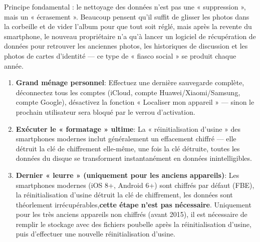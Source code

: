 


Principe fondamental : le nettoyage des données n'est pas une « suppression », mais un « écrasement ». Beaucoup pensent qu'il suffit de glisser les photos dans la corbeille et de vider l'album pour que tout soit réglé, mais après la revente du smartphone, le nouveau propriétaire n'a qu'à lancer un logiciel de récupération de données pour retrouver les anciennes photos, les historiques de discussion et les photos de cartes d'identité — ce type de « fiasco social » se produit chaque année.

\begin{enumerate}
  \item \textbf{Grand ménage personnel}: Effectuez une dernière sauvegarde complète, déconnectez tous les comptes (iCloud, compte Huawei/Xiaomi/Samsung, compte Google), désactivez la fonction « Localiser mon appareil » — sinon le prochain utilisateur sera bloqué par le verrou d'activation.
  \item \textbf{Exécuter le « formatage » ultime}: La « réinitialisation d'usine » des smartphones modernes inclut généralement un effacement chiffré — elle détruit la clé de chiffrement elle-même, une fois la clé détruite, toutes les données du disque se transforment instantanément en données inintelligibles.
  \item \textbf{Dernier « leurre » (uniquement pour les anciens appareils)}: Les smartphones modernes (iOS 8+, Android 6+) sont chiffrés par défaut (FBE), la réinitialisation d'usine détruit la clé de chiffrement, les données sont théorlement irrécupérables,\textbf{cette étape n'est pas nécessaire}. Uniquement pour les très anciens appareils non chiffrés (avant 2015), il est nécessaire de remplir le stockage avec des fichiers poubelle après la réinitialisation d'usine, puis d'effectuer une nouvelle réinitialisation d'usine.
\end{enumerate}

